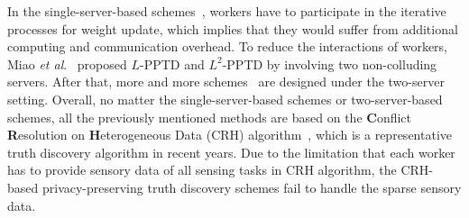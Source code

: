 \documentclass[conference]{IEEEtran}
\begin{document}
In the single-server-based schemes~\cite{miao_cloud-enabled_2015,xu_efficient_2019}, workers have to participate in the iterative processes for weight update, which implies that they would suffer from additional computing and communication overhead.
To reduce the interactions of workers, Miao {\em et al}.~\cite{miao_lightweight_2017} proposed $L$-PPTD and $L^2$-PPTD by involving two non-colluding servers.
After that, more and more schemes~\cite{zhang_reliable_2019,xue_inpptd_2020,tang_achieving_2021} are designed under the two-server setting.
Overall, no matter the single-server-based schemes or two-server-based schemes, all the previously mentioned methods are based on the {\bf C}onflict {\bf R}esolution on {\bf H}eterogeneous Data (CRH) algorithm~\cite{li_resolving_2014}, which is a representative truth discovery algorithm in recent years.
Due to the limitation that each worker has to provide sensory data of all sensing tasks in CRH algorithm, the CRH-based privacy-preserving truth discovery schemes fail to handle the sparse sensory data.
\end{document}
